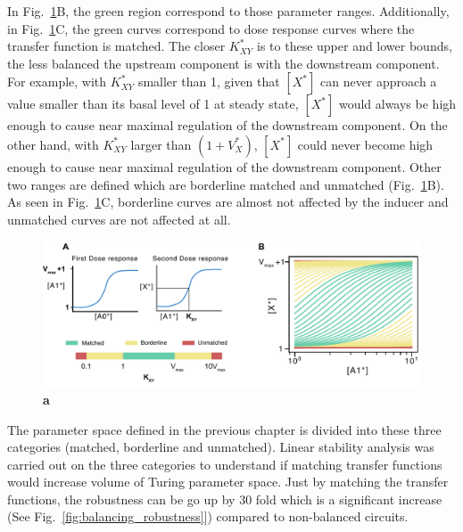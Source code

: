 In Fig.~\ref{fig:balancing}B, the green region correspond to those parameter ranges.
Additionally, in Fig.~\ref{fig:balancing}C, the green curves correspond to dose response curves where the transfer function is matched.
The closer $K^*_{XY}$ is to these upper and lower bounds, the less balanced the upstream component is with the downstream component.
For example, with $K^*_{XY}$ smaller than 1, given that $[X^*]$ can never approach a value smaller than its basal level of 1 at steady state, $[X^*]$ would always be high enough to cause near maximal regulation of the downstream component.
On the other hand, with $K^*_{XY}$ larger than $(1+V^*_{X})$, $[X^*]$ could never become high enough to cause near maximal regulation of the downstream component.
Other two ranges are defined which are borderline matched and unmatched (Fig.~\ref{fig:balancing}B).
As seen in Fig.~\ref{fig:balancing}C, borderline curves are almost not affected by the inducer and unmatched curves are not affected at all.


\begin{figure}[H]
    \centering
    \includegraphics[width=1\textwidth]{chapters/Chapter 2/balancing}
    \caption[]{\textbf{a} } %
    \label{fig:balancing}
\end{figure}


The parameter space defined in the previous chapter is divided into these three categories (matched, borderline and unmatched).
Linear stability analysis was carried out on the three categories to understand if matching transfer functions would increase volume of Turing parameter space.
Just by matching the transfer functions, the robustness can be go up by 30 fold which is a significant increase (See Fig.~\ref{fig:balancing_robustness}]) compared to non-balanced circuits.


